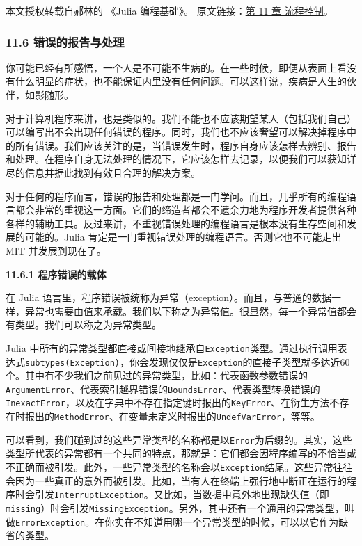 
本文授权转载自郝林的 《Julia 编程基础》。 原文链接：\href{https://github.com/hyper0x/JuliaBasics/blob/master/book/ch11.md}{第 11 章 流程控制}。


\subsubsection{11.6 错误的报告与处理}

你可能已经有所感悟，一个人是不可能不生病的。在一些时候，即便从表面上看没有什么明显的症状，也不能保证内里没有任何问题。可以这样说，疾病是人生的伙伴，如影随形。

对于计算机程序来讲，也是类似的。我们不能也不应该期望某人（包括我们自己）可以编写出不会出现任何错误的程序。同时，我们也不应该奢望可以解决掉程序中的所有错误。我们应该关注的是，当错误发生时，程序自身应该怎样去辨别、报告和处理。在程序自身无法处理的情况下，它应该怎样去记录，以便我们可以获知详尽的信息并据此找到有效且合理的解决方案。

对于任何的程序而言，错误的报告和处理都是一门学问。而且，几乎所有的编程语言都会非常的重视这一方面。它们的缔造者都会不遗余力地为程序开发者提供各种各样的辅助工具。反过来讲，不重视错误处理的编程语言是根本没有生存空间和发展的可能的。Julia 肯定是一门重视错误处理的编程语言。否则它也不可能走出 MIT 并发展到现在了。

\textbf{11.6.1 程序错误的载体}

在 Julia 语言里，程序错误被统称为异常（exception）。而且，与普通的数据一样，异常也需要由值来承载。我们以下称之为异常值。很显然，每一个异常值都会有类型。我们可以称之为异常类型。

Julia 中所有的异常类型都直接或间接地继承自\verb|Exception|类型。通过执行调用表达式\verb|subtypes(Exception)|，你会发现仅仅是\verb|Exception|的直接子类型就多达近60个。其中有不少我们之前见过的异常类型，比如：代表函数参数错误的\verb|ArgumentError|、代表索引越界错误的\verb|BoundsError|、代表类型转换错误的\verb|InexactError|，以及在字典中不存在指定键时报出的\verb|KeyError|、在衍生方法不存在时报出的\verb|MethodError|、在变量未定义时报出的\verb|UndefVarError|，等等。

可以看到，我们碰到过的这些异常类型的名称都是以\verb|Error|为后缀的。其实，这些类型所代表的异常都有一个共同的特点，那就是：它们都会因程序编写的不恰当或不正确而被引发。此外，一些异常类型的名称会以\verb|Exception|结尾。这些异常往往会因为一些真正的意外而被引发。比如，当有人在终端上强行地中断正在运行的程序时会引发\verb|InterruptException|。又比如，当数据中意外地出现缺失值（即\verb|missing|）时会引发\verb|MissingException|。另外，其中还有一个通用的异常类型，叫做\verb|ErrorException|。在你实在不知道用哪一个异常类型的时候，可以以它作为缺省的类型。

